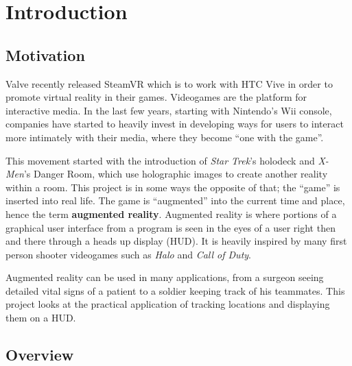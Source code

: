 
\chapter{Introduction} %

\label{Introduction} %


\section{Motivation}

Valve recently released SteamVR which is to work with HTC Vive in order to promote virtual reality in their games. Videogames are the platform for interactive media. In the last few years, starting with Nintendo’s Wii console, companies have started to heavily invest in developing ways for users to interact more intimately with their media, where they become ``one with the game”. 

This movement started with the introduction of \emph{Star Trek}’s holodeck and \emph{X-Men}’s Danger Room, which use holographic images to create another reality within a room. This project is in some ways the opposite of that; the ``game'' is inserted into real life. The game is “augmented” into the current time and place, hence the term \textbf{augmented reality}. Augmented reality is where portions of a graphical user interface from a program is seen in the eyes of a user right then and there through a heads up display (HUD). It is heavily inspired by many first person shooter videogames such as \emph{Halo} and \emph{Call of Duty}. 

Augmented reality can be used in many applications, from a surgeon seeing detailed vital signs of a patient to a soldier keeping track of his teammates. This project looks at the practical application of tracking locations and displaying them on a HUD.

\section{Overview}

